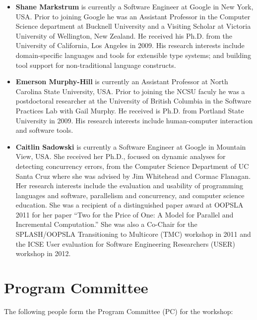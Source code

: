 \documentclass[10pt]{sigplanconf}
\begin{document}
\begin{itemize}
\item \textbf{Shane Markstrum} is currently a Software Engineer at Google in New York, USA. Prior to joining Google he was an Assistant Professor in the Computer Science
  department at Bucknell University and a Visiting Scholar at Victoria University of Wellington, New Zealand. He received his Ph.D. from the University of
  California, Los Angeles in 2009. His research interests include
  domain-specific languages and tools for extensible type systems; and 
  building tool support for non-traditional language constructs.
  
\item \textbf{Emerson Murphy-Hill} is currently an Assistant Professor at North Carolina State University, USA. Prior to joining the NCSU faculy he was a postdoctoral researcher at the University of British Columbia in the Software Practices Lab with Gail Murphy. 
  He received is Ph.D. from Portland State University in 2009.
  His research interests include human-computer interaction and software tools. 

\item \textbf{Caitlin Sadowski} is currently a Software Engineer at Google in Mountain View, USA. She received her Ph.D., focused on dynamic analyses for detecting concurrency errors, from the Computer Science Department of UC Santa Cruz where she was advised by Jim Whitehead and Cormac Flanagan.  %
 Her research interests include the evaluation and usability of programming languages and software, parallelism and concurrency, and computer science education. She was a recipient of a distinguished paper award at OOPSLA 2011 for her paper ``Two for the Price of One: A Model for Parallel and Incremental Computation.''
 She was also a Co-Chair for the SPLASH/OOPSLA Transitioning to Multicore (TMC) workshop in 2011 and the ICSE User evaluation for Software Engineering Researchers (USER) workshop in 2012. 
\end{itemize}

\section{Program Committee}

The following people form the Program Committee (PC) for the workshop: %
\end{document}
